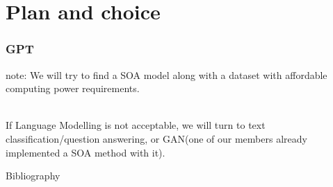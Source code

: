 \documentclass{beamer}
\begin{document}
\section{Plan and choice}
\begin{frame}
  \frametitle{GPT}
  note: We will try to find a SOA model along with a dataset with affordable computing power requirements.\\\
  
  If Language Modelling is not acceptable, we will turn to text classification/question answering, or GAN(one of our members already implemented a SOA method with it).
\end{frame}
\begin{frame}[allowframebreaks]{Bibliography}
  
\end{frame}
\end{document}
